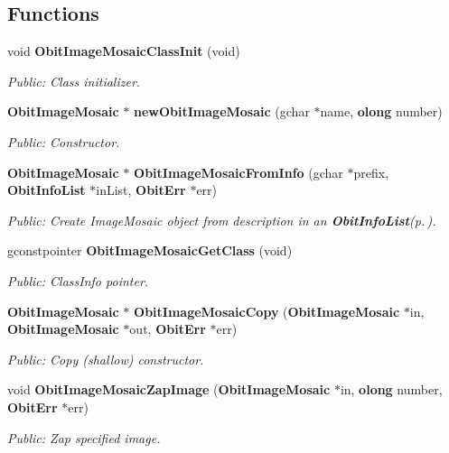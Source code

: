 \subsection*{Functions}
\begin{CompactItemize}
\item 
void {\bf Obit\-Image\-Mosaic\-Class\-Init} (void)
\begin{CompactList}\small\item\em Public: Class initializer. \item\end{CompactList}\item 
{\bf Obit\-Image\-Mosaic} $\ast$ {\bf new\-Obit\-Image\-Mosaic} (gchar $\ast$name, {\bf olong} number)
\begin{CompactList}\small\item\em Public: Constructor. \item\end{CompactList}\item 
{\bf Obit\-Image\-Mosaic} $\ast$ {\bf Obit\-Image\-Mosaic\-From\-Info} (gchar $\ast$prefix, {\bf Obit\-Info\-List} $\ast$in\-List, {\bf Obit\-Err} $\ast$err)
\begin{CompactList}\small\item\em Public: Create Image\-Mosaic object from description in an {\bf Obit\-Info\-List}{\rm (p.\,\pageref{structObitInfoList})}. \item\end{CompactList}\item 
gconstpointer {\bf Obit\-Image\-Mosaic\-Get\-Class} (void)
\begin{CompactList}\small\item\em Public: Class\-Info pointer. \item\end{CompactList}\item 
{\bf Obit\-Image\-Mosaic} $\ast$ {\bf Obit\-Image\-Mosaic\-Copy} ({\bf Obit\-Image\-Mosaic} $\ast$in, {\bf Obit\-Image\-Mosaic} $\ast$out, {\bf Obit\-Err} $\ast$err)
\begin{CompactList}\small\item\em Public: Copy (shallow) constructor. \item\end{CompactList}\item 
void {\bf Obit\-Image\-Mosaic\-Zap\-Image} ({\bf Obit\-Image\-Mosaic} $\ast$in, {\bf olong} number, {\bf Obit\-Err} $\ast$err)
\begin{CompactList}\small\item\em Public: Zap specified image. \item\end{CompactList}\item 

\end{CompactItemize}

